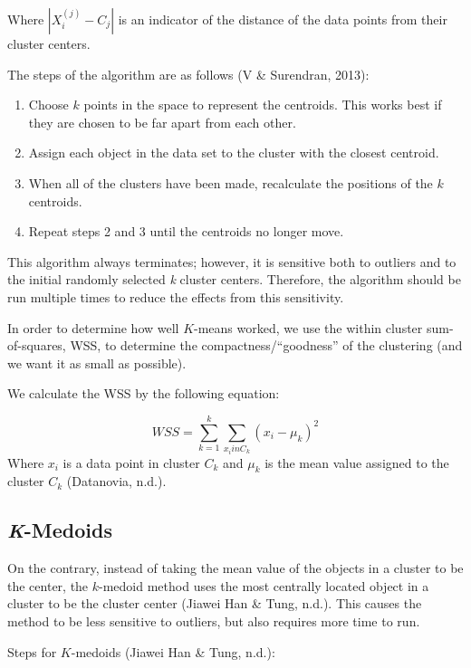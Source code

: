 \documentclass[12pt,twoside]{amherstthesis}
\begin{document}
  Where \(|{{X_i^{(j)}- C_j}}|\) is an indicator of the distance of the
  data points from their cluster centers.
  
  The steps of the algorithm are as follows (V \& Surendran, 2013):
  
  \begin{enumerate}
  \def\labelenumi{\arabic{enumi}.}
  \item
    Choose \(k\) points in the space to represent the centroids. This
    works best if they are chosen to be far apart from each other.
  \item
    Assign each object in the data set to the cluster with the closest
    centroid.
  \item
    When all of the clusters have been made, recalculate the positions of
    the \(k\) centroids.
  \item
    Repeat steps 2 and 3 until the centroids no longer move.
  \end{enumerate}
  
  This algorithm always terminates; however, it is sensitive both to
  outliers and to the initial randomly selected \emph{k} cluster centers.
  Therefore, the algorithm should be run multiple times to reduce the
  effects from this sensitivity.
  
  In order to determine how well \(K\)-means worked, we use the within
  cluster sum-of-squares, WSS, to determine the compactness/``goodness''
  of the clustering (and we want it as small as possible).
  
  We calculate the WSS by the following equation:
  
  \[WSS = \sum_{k=1}^k \sum_{x_i in C_k} ({{x_i- \mu_k}})^2\] Where
  \(x_i\) is a data point in cluster \(C_k\) and \(\mu_k\) is the mean
  value assigned to the cluster \(C_k\) (Datanovia, n.d.).
  
  \subsection{\texorpdfstring{\emph{K}-Medoids}{K-Medoids}}\label{k-medoids}
  
  On the contrary, instead of taking the mean value of the objects in a
  cluster to be the center, the \(k\)-medoid method uses the most
  centrally located object in a cluster to be the cluster center (Jiawei
  Han \& Tung, n.d.). This causes the method to be less sensitive to
  outliers, but also requires more time to run.
  
  Steps for \(K\)-medoids (Jiawei Han \& Tung, n.d.):
  
\end{document}
